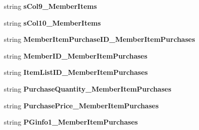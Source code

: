 \begin{DoxyCompactItemize}
\item 
string {\bfseries s\+Col9\+\_\+\+Member\+Items}\hypertarget{a00113_a5bb4b7495ec5b05acb3c728af9ce20ad}{}\label{a00113_a5bb4b7495ec5b05acb3c728af9ce20ad}

\item 
string {\bfseries s\+Col10\+\_\+\+Member\+Items}\hypertarget{a00113_a1d88b688ba5cc8449c473660d328883a}{}\label{a00113_a1d88b688ba5cc8449c473660d328883a}

\item 
string {\bfseries Member\+Item\+Purchase\+I\+D\+\_\+\+Member\+Item\+Purchases}\hypertarget{a00113_a9486101c845166cf0deafc71afe4e6e6}{}\label{a00113_a9486101c845166cf0deafc71afe4e6e6}

\item 
string {\bfseries Member\+I\+D\+\_\+\+Member\+Item\+Purchases}\hypertarget{a00113_a60bb1c18037d5bf434f81e42072294fa}{}\label{a00113_a60bb1c18037d5bf434f81e42072294fa}

\item 
string {\bfseries Item\+List\+I\+D\+\_\+\+Member\+Item\+Purchases}\hypertarget{a00113_a1dc3abd5d6204740ecedbb29d84d01f6}{}\label{a00113_a1dc3abd5d6204740ecedbb29d84d01f6}

\item 
string {\bfseries Purchase\+Quantity\+\_\+\+Member\+Item\+Purchases}\hypertarget{a00113_a8fdbb8c322066c050de5163de956524d}{}\label{a00113_a8fdbb8c322066c050de5163de956524d}

\item 
string {\bfseries Purchase\+Price\+\_\+\+Member\+Item\+Purchases}\hypertarget{a00113_a27979eca75e0d21712fe622f0837e02f}{}\label{a00113_a27979eca75e0d21712fe622f0837e02f}

\item 
string {\bfseries P\+Ginfo1\+\_\+\+Member\+Item\+Purchases}\hypertarget{a00113_a649d3d9ca9d96365d0cd05c7ab50adcf}{}\label{a00113_a649d3d9ca9d96365d0cd05c7ab50adcf}


\end{DoxyCompactItemize}
